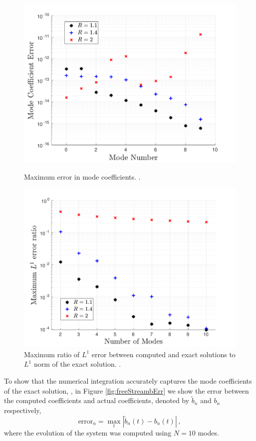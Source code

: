 \begin{figure}[ht]
\centerline{\includegraphics[width=0.8\linewidth]{06-appendix/SpectralMethodBoltzmann/Figures/free_stream_b_err.pdf}}
\caption{Maximum error in mode coefficients. .}\label{fig:freeStreambErr}
\centerline{\includegraphics[width=0.8\linewidth]{06-appendix/SpectralMethodBoltzmann/Figures/free_stream_L1_err.pdf}}
\caption{Maximum ratio  of $L^1$ error between computed and exact solutions to $L^1$ norm of the exact solution. .}\label{fig:freeStreamL1Err}
\end{figure}

To show that the numerical integration accurately captures the mode coefficients of the exact solution, , in Figure \ref{fig:freeStreambErr} we show the error between the computed coefficients and actual coefficients, denoted by $\tilde b_n$ and $b_n$ respectively,
\begin{equation}\label{modeErrDef}
\text{error}_n=\max_{t} |\tilde{b}_n(t)-b_n(t)|\,,
\end{equation}
 where the evolution of the system was computed using $N=10$ modes.



